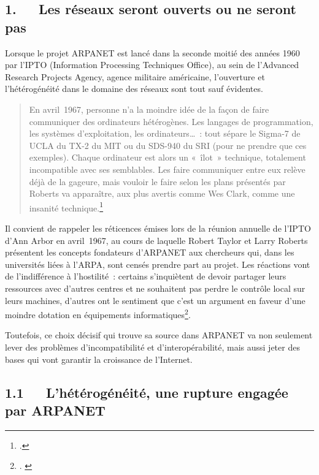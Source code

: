 \documentclass{FramateX}
\begin{document}
\begin{refsection}
\section*{1.~~~Les réseaux seront ouverts ou ne seront pas}
{}


Lorsque le projet ARPANET est lancé dans la seconde moitié des années
1960 par l'IPTO (Information Processing Techniques Office), au sein de
l'Advanced Research Projects Agency, agence
militaire américaine, l'ouverture et
l'hétérogénéité dans le domaine des réseaux sont tout
sauf évidentes.

\begin{quote}
En avril~1967, personne n'a la moindre idée de la
façon de faire communiquer des ordinateurs hétérogènes. Les langages de
programmation, les systèmes d'exploitation, les
ordinateurs\ldots~: tout sépare le Sigma-7 de UCLA du TX-2 du MIT ou du
SDS-940 du SRI (pour ne prendre que ces exemples). Chaque ordinateur
est alors un «~îlot~» technique, totalement incompatible avec ses
semblables. Les faire communiquer entre eux relève déjà de la gageure,
mais vouloir le faire selon les plans présentés par Roberts va
apparaître, aux plus avertis comme Wes Clark, comme une insanité
technique.\footnote{\cite[p.~415]{serresaux2000}.}
\end{quote}

Il convient de rappeler les réticences émises lors de la réunion
annuelle de l'IPTO d'Ann Arbor en
avril~1967, au cours de laquelle Robert Taylor et Larry Roberts
présentent les concepts fondateurs d'ARPANET aux
chercheurs qui, dans les universités liées à l'ARPA,
sont censés prendre part au projet. Les réactions vont de
l'indifférence à l'hostilité~:
certains s'inquiètent de devoir partager leurs
ressources avec d'autres centres et ne souhaitent pas
perdre le contrôle local sur leurs machines, d'autres
ont le sentiment que c'est un argument en faveur
d'une moindre dotation en équipements
informatiques\footnote{\cite[pp.~411-413]{serresaux2000}.  \cite[p.~50]{abbateinventing1999}}. 

Toutefois, ce choix décisif qui trouve sa source dans ARPANET va non
seulement lever des problèmes d'incompatibilité et
d'interopérabilité, mais aussi jeter des bases qui
vont garantir la croissance de l'Internet. 

\subsection*{1.1~~~L'hétérogénéité, une rupture engagée par ARPANET}
{}


\end{refsection}
\end{document}
